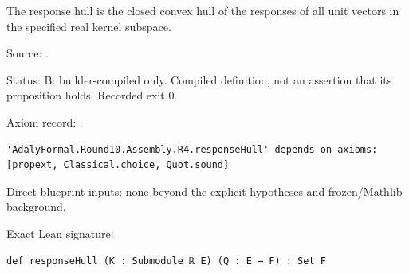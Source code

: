 \begin{definition}[bp-166]
\label{bp-166}
\uses{}
\leanok
The response hull is the closed convex hull of the responses of all unit vectors in the specified real kernel subspace.

\par Source: \texttt{}.
\par Status: B: builder-compiled only. Compiled definition, not an assertion that its proposition holds. Recorded exit 0.
\par Axiom record: \texttt{}.
\begin{verbatim}
'AdalyFormal.Round10.Assembly.R4.responseHull' depends on axioms: [propext, Classical.choice, Quot.sound]
\end{verbatim}
\par Direct blueprint inputs: none beyond the explicit hypotheses and frozen/Mathlib background.
\par Exact Lean signature:
\begin{verbatim}
def responseHull (K : Submodule ℝ E) (Q : E → F) : Set F
\end{verbatim}
\end{definition}


